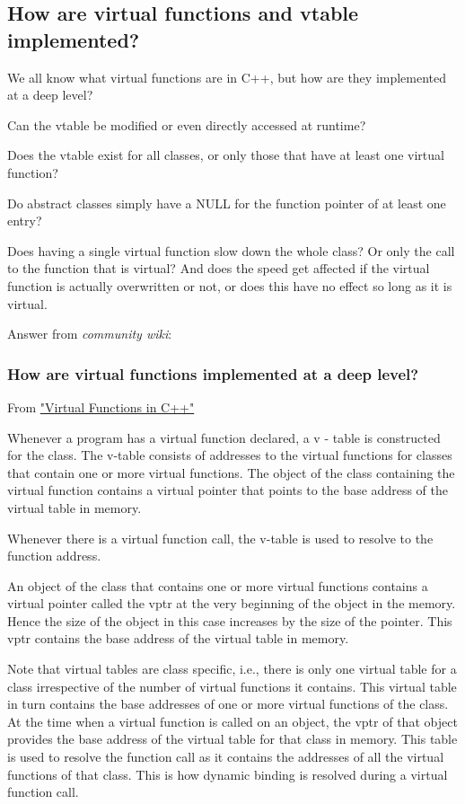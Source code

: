\documentclass[10pt]{amsart}
\begin{document}
\begin{multicols*}{2}
\subsection{How are virtual functions and vtable implemented?}

We all know what virtual functions are in C++, but how are they implemented at a deep level?

Can the vtable be modified or even directly accessed at runtime?

Does the vtable exist for all classes, or only those that have at least one virtual function?

Do abstract classes simply have a NULL for the function pointer of at least one entry?

Does having a single virtual function slow down the whole class? Or only the call to the function that is virtual? And does the speed get affected if the virtual function is actually overwritten or not, or does this have no effect so long as it is virtual.

Answer from \emph{community wiki}:  

\subsubsection{How are virtual functions implemented at a deep level?}

From \href{http://wayback.archive.org/web/20100209040010/http://www.codersource.net/published/view/325/virtual_functions_in.aspx}{"Virtual Functions in C++"}

Whenever a program has a virtual function declared, a v - table is constructed for the class. The v-table consists of addresses to the virtual functions for classes that contain one or more virtual functions. The object of the class containing the virtual function contains a virtual pointer that points to the base address of the virtual table in memory.  

Whenever there is a virtual function call, the v-table is used to resolve to the function address.  

An object of the class that contains one or more virtual functions contains a virtual pointer called the vptr at the very beginning of the object in the memory. Hence the size of the object in this case increases by the size of the pointer. This vptr contains the base address of the virtual table in memory.  

Note that virtual tables are class specific, i.e., there is only one virtual table for a class irrespective of the number of virtual functions it contains. This virtual table in turn contains the base addresses of one or more virtual functions of the class. At the time when a virtual function is called on an object, the vptr of that object provides the base address of the virtual table for that class in memory. This table is used to resolve the function call as it contains the addresses of all the virtual functions of that class. This is how dynamic binding is resolved during a virtual function call.


\end{multicols*}
\end{document}
